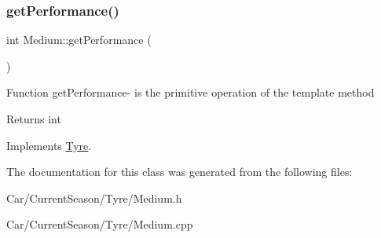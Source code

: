 \subsubsection{\texorpdfstring{get\+Performance()}{getPerformance()}}
{\footnotesize\ttfamily int Medium\+::get\+Performance (\begin{DoxyParamCaption}{ }\end{DoxyParamCaption})\hspace{0.3cm}{\ttfamily [virtual]}}

Function get\+Performance-\/ is the primitive operation of the template method \begin{DoxyReturn}{Returns}
int 
\end{DoxyReturn}


Implements \hyperlink{classTyre_a039a0e53d35fb8bb9301e05b13af1478}{Tyre}.



The documentation for this class was generated from the following files\+:\begin{DoxyCompactItemize}
\item 
Car/\+Current\+Season/\+Tyre/Medium.\+h\item 
Car/\+Current\+Season/\+Tyre/Medium.\+cpp\end{DoxyCompactItemize}
